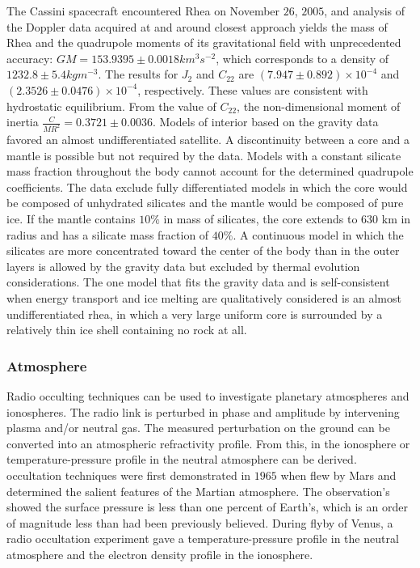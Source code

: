 \documentclass[oneside]{book}
\theoremstyle{mystyle}
\begin{document}
The Cassini spacecraft encountered Rhea on November $26$, $2005$, and analysis of the Doppler data acquired at and around closest approach yields the mass of Rhea and the \gls{quadrupole} moments of its \gls{gravitational field} with unprecedented accuracy: $GM=153.9395\pm 0.0018 km^{3}s^{-2}$, which corresponds to a density of $1232.8\pm 5.4
kg m^{-3}$. The results for $J_{2}$ and $C_{22}$ are $(7.947\pm 0.892)\times 10^{-4}$ and $(2.3526\pm 0.0476)\times 10^{-4}$, respectively. These values are consistent with \gls{hydrostatic} equilibrium. From the value of $C_{22}$, the non-dimensional moment of inertia $\frac{C}{MR^{2}} = 0.3721 \pm 0.0036$. Models of  interior based on the gravity data favored an almost undifferentiated satellite. A discontinuity between a core and a mantle is possible but not required by the data. Models with a constant silicate mass fraction throughout the body cannot account for the determined \gls{quadrupole} coefficients. The data exclude fully differentiated models in which the core would be composed of unhydrated silicates and the mantle would be
composed of pure ice. If the mantle contains $10\%$ in mass of silicates, the core extends to
630 km in radius and has a silicate mass fraction of $40\%$. A continuous model in which
the silicates are more concentrated toward the center of the body than in the outer layers is allowed by the gravity data but excluded by thermal evolution considerations. The one model that fits the gravity data and is self-consistent when energy transport and ice melting are qualitatively considered is an almost undifferentiated \gls{rhea}, in which a very large uniform core is surrounded by a relatively thin ice shell containing no rock at all.
\subsubsection{Atmosphere}
Radio occulting techniques can be used to investigate planetary \glspl{atmosphere} and \glspl{ionosphere}. The radio link is perturbed in \gls{phase} and \gls{amplitude} by intervening \gls{plasma} and/or neutral gas. The measured perturbation on the ground can be converted into an atmospheric refractivity profile. From this,  in the \gls{ionosphere} or \gls{temperature-pressure profile} in the \gls{neutral atmosphere} can be derived. \Gls{occultation} techniques were first demonstrated in $1965$ when  flew by Mars and determined the salient features of the Martian \gls{atmosphere}. The observation's showed the surface pressure is less than one percent of Earth's, which is an order of magnitude less than had been previously believed. During  flyby of Venus, a radio \gls{occultation} experiment gave a \gls{temperature-pressure profile} in the \gls{neutral atmosphere} and the \gls{electron density profile} in the ionosphere. 
\end{document}
